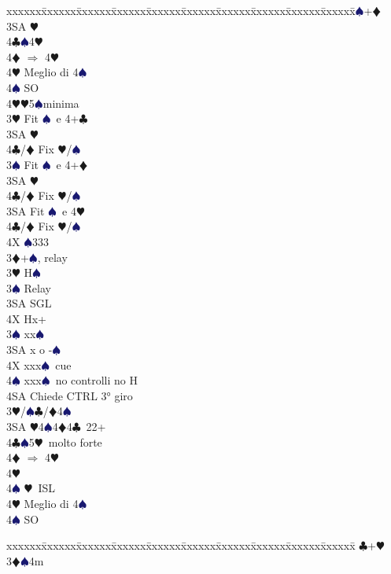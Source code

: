 \documentclass[a4paper,italian]{article}
\newcommand{\BC}{\textcolor{OliveGreen}{$\clubsuit$}}
\newcommand{\BD}{\textcolor{RedOrange}{$\vardiamondsuit$}}
\newcommand{\BH}{\textcolor{Red2}{$\varheartsuit${}}}
\newcommand{\BS}{\textcolor{MidnightBlue}{$\spadesuit${}}}
\newenvironment{bidtable}
{\begin{tabbing}

    xxxxxx\=xxxxxx\=xxxxxx\=xxxxxx\=xxxxxx\=xxxxxx\=xxxxxx\=xxxxxx\=xxxxxx\=xxxxxx\=\kill}
{\end{tabbing} }%
\begin{document}
\begin{multicols}{2}
\begin{bidtable}
        3\BS {}+\BD \\
        3SA \BH \\
        4\BC {}\BS 4\BH\+\\
        4\BD \> $\Rightarrow$ 4\BH\\
        4\BH \> Meglio di 4\BS\\
        4\BS \> SO\-\\
        4\BH {}\BH 5\BS minima\-\\
        3\BH \> Fit \BS\ e 4+\BC \+\\
        3SA \BH \+\\
        4\BC/\BD \> Fix \BH/\BS\-\-\\
        3\BS \> Fit \BS\ e 4+\BD \+\\
        3SA \BH \+\\
        4\BC/\BD \> Fix \BH/\BS\-\-\\
        3SA \> Fit \BS\ e 4\BH \+\\
        4\BC/\BD \> Fix \BH/\BS\-\\
        4X \BS 333\-\\
        3\BD {}+\BS , relay\+\\
        3\BH \> H\BS \+\\
        3\BS \> Relay\+\\
        3SA \> SGL\\
        4X \> Hx+\-\-\\
        3\BS \> xx\BS \\
        3SA \> x o -\BS \\
        4X \> xxx\BS\ cue\\
        4\BS \> xxx\BS\ no controlli no H\+\\
        4SA \> Chiede CTRL 3° giro\-\-\\
        3\BH/\BS {}\BC /\BD 4\BS \\
        3SA \BH 4\BS 4\BD 4\BC\ 22+\\
        4\BC {}\BS 5\BH\ molto forte\+\\
        4\BD \> $\Rightarrow$ 4\BH \+\\
        4\BH\+\\
        4\BS \> \BH\ ISL\-\-\\
        4\BH \> Meglio di 4\BS \\
        4\BS \> SO
    \end{bidtable}
    \begin{bidtable}
        \BC {}+\BH \+\+\\
        3\BD {}\BS 4m\+\\

\end{bidtable}
\end{multicols}
\end{document}
